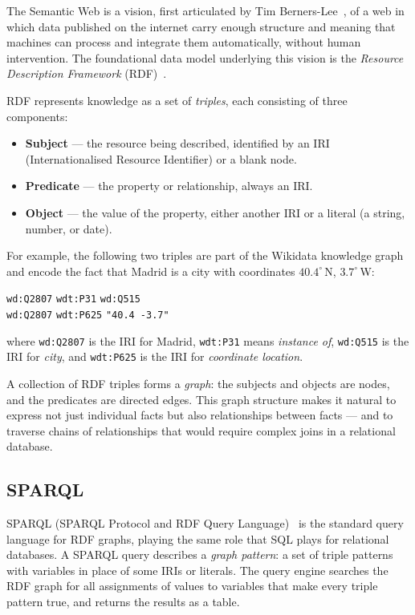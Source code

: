 The Semantic Web is a vision, first articulated by
Tim Berners-Lee~\cite{bernerslee2001}, of a web in which data published on the
internet carry enough structure and meaning that machines can process and
integrate them automatically, without human intervention. The foundational data
model underlying this vision is the \emph{Resource Description Framework}
(RDF)~\cite{rdf11}.

RDF represents knowledge as a set of \emph{triples}, each consisting of three
components:

\begin{itemize}
  \item \textbf{Subject} --- the resource being described, identified by an IRI
    (Internationalised Resource Identifier) or a blank node.
  \item \textbf{Predicate} --- the property or relationship, always an IRI.
  \item \textbf{Object} --- the value of the property, either another IRI or a
    literal (a string, number, or date).
\end{itemize}

For example, the following two triples are part of the Wikidata knowledge graph
and encode the fact that Madrid is a city with coordinates $40.4^\circ$\,N,
$3.7^\circ$\,W:
\begin{center}
  \texttt{wd:Q2807} \quad \texttt{wdt:P31} \quad \texttt{wd:Q515} \\
  \texttt{wd:Q2807} \quad \texttt{wdt:P625} \quad \texttt{"40.4 -3.7"}
\end{center}
where \texttt{wd:Q2807} is the IRI for Madrid, \texttt{wdt:P31} means
\emph{instance of}, \texttt{wd:Q515} is the IRI for \emph{city}, and
\texttt{wdt:P625} is the IRI for \emph{coordinate location}.

A collection of RDF triples forms a \emph{graph}: the subjects and objects are
nodes, and the predicates are directed edges. This graph structure makes it
natural to express not just individual facts but also relationships between
facts --- and to traverse chains of relationships that would require complex
joins in a relational database.

\subsection{SPARQL}\label{REL_SEMWEB_SPARQL}

SPARQL (SPARQL Protocol and RDF Query Language)~\cite{sparql11} is the standard
query language for RDF graphs, playing the same role that SQL plays for
relational databases. A SPARQL query describes a \emph{graph pattern}: a set of
triple patterns with variables in place of some IRIs or literals. The query
engine searches the RDF graph for all assignments of values to variables that
make every triple pattern true, and returns the results as a table.

